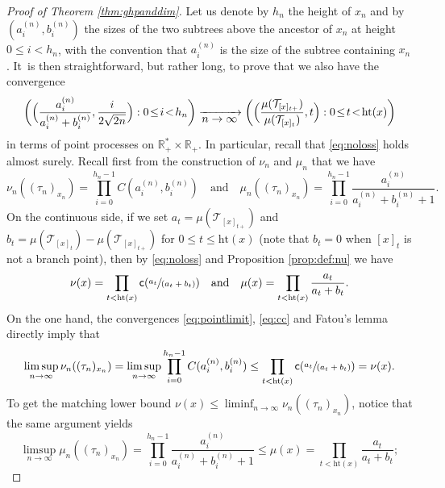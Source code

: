 \documentclass[JEP,XML,SOM,Unicode,NoFloatCountersInSection, NoEqCountersInSection,published]{cedram}
\newcommand{\spfrac}[2]{\sfrac{#1}{(#2)}}
\newcommand{\T}{\mathcal{T}}\let\CRT\T\let\tbr\T
\theoremstyle{definition}
\begin{document}
\begin{proof}[Proof of Theorem \ref{thm:ghpanddim}]
Let us denote by $h_n$ the height of $x_n$ and by $(a^{(n)}_i,b^{(n)}_i)$ the sizes of the two subtrees above the ancestor of $x_n$ at height $0\leq i < h_n$, with the convention that $a^{(n)}_i$ is the size of the subtree containing $x_n$. It~is then straightforward, but rather long, to prove that we also have the convergence\vspace*{-3pt}\enlargethispage{\baselineskip}
\begin{equation} \label{eq:pointlimit} \biggl(\Bigl(\frac{a_i^{(n)}}{a_i^{(n)}+b_i^{(n)}} , \frac{i}{ 2\sqrt{2n}} \Bigr) : 0 \!\leq\! i \!<\! h_n \biggr) \xrightarrow[\textstyle n \to \infty]{}\biggl(\Bigl(\frac{\mu(\T_{[x]_{t+}})}{\mu(\T_{[x]_{t}})},t \Bigr) : 0 \!\leq\! t\! <\! \mathrm{ht}(x) \biggr)
\end{equation}
in terms of point processes on $ \mathbb{R}_+^* \times \mathbb{R}_+$. In particular, recall that \eqref{eq:noloss} holds almost surely.
Recall first from the construction of $\nu_n$ and $\mu_n$ that we have\vspace*{-3pt}
\begin{equation} \label{rappelnun} \nu_n((\tau_n)_{x_n}) = \prod_{i=0}^{h_n-1} C(a_i^{(n)}, b_i^{(n)}) \quad \text{and} \quad \mu_n((\tau_n)_{x_n}) = \prod_{i=0}^{h_n-1} \frac{a_i^{(n)}}{a_i^{(n)}+b_i^{(n)}+1}.
\end{equation}
On the continuous side, if we set $a_t = \mu(\T_{[x]_{t+}})$ and $b_t = \mu(\T_{[x]_{t}})-\mu(\T_{[x]_{t+}})$ for $0 \leq t \leq \mathrm{ht}(x)$ (note that $b_t=0$ when $[x]_t$ is not a branch point), then by \eqref{eq:noloss} and Proposition \ref{prop:def:nu} we have\vspace*{-3pt}
\begin{equation} \label{rappelnu}\nu(x) = \prod_{t < \mathrm{ht}(x)} \mathsf{c}(\spfrac{a_t}{a_t+b_t}) \quad \text{and} \quad \mu(x) = \prod_{t < \mathrm{ht}(x)} \frac{a_t}{a_t+b_t}.
\end{equation}
On the one hand, the convergences \eqref{eq:pointlimit}, \eqref{eq:cc} and Fatou's lemma directly imply that\vspace*{-3pt}
\[
\limsup_{n \to \infty} \nu_n((\tau_n)_{x_n}) = \limsup_{n \to \infty}\prod_{i=0}^{h_n-1} C(a_i^{(n)}, b_i^{(n)}) \leq \prod_{t < \mathrm{ht}(x)} \mathsf{c}(\spfrac{a_t}{a_t+b_t}) =\nu(x).
\]
To get the matching lower bound $\nu(x)\leq \liminf_{n \to \infty} \nu_n((\tau_n)_{x_n})$, notice that the same argument yields\vspace*{-3pt}
\[
\limsup_{n \to \infty} \mu_n((\tau_n)_{x_n}) = \prod_{i=0}^{h_n-1} \frac{a_i^{(n)}}{a_i^{(n)}+b_i^{(n)}+1} \leq \mu(x) = \prod_{t < \mathrm{ht}(x)} \frac{a_t}{a_t+b_t};
\]
\end{proof}
\end{document}
